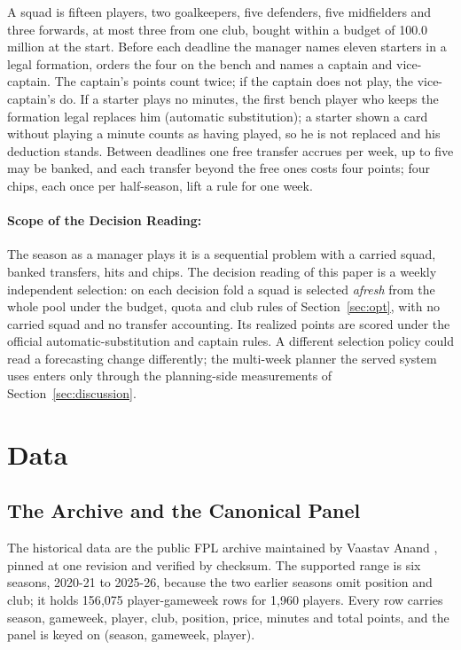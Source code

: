 \documentclass[11pt,a4paper]{article}
\begin{document}
A squad is fifteen players, two goalkeepers, five defenders, five midfielders and three forwards, at most three from one club, bought within a budget of 100.0 million at the start. Before each deadline the manager names eleven starters in a legal formation, orders the four on the bench and names a captain and vice-captain. The captain's points count twice; if the captain does not play, the vice-captain's do. If a starter plays no minutes, the first bench player who keeps the formation legal replaces him (automatic substitution); a starter shown a card without playing a minute counts as having played, so he is not replaced and his deduction stands. Between deadlines one free transfer accrues per week, up to five may be banked, and each transfer beyond the free ones costs four points; four chips, each once per half-season, lift a rule for one week.

\paragraph{Scope of the Decision Reading:} The season as a manager plays it is a sequential problem with a carried squad, banked transfers, hits and chips. The decision reading of this paper is a weekly independent selection: on each decision fold a squad is selected \emph{afresh} from the whole pool under the budget, quota and club rules of Section~\ref{sec:opt}, with no carried squad and no transfer accounting. Its realized points are scored under the official automatic-substitution and captain rules. A different selection policy could read a forecasting change differently; the multi-week planner the served system uses enters only through the planning-side measurements of Section~\ref{sec:discussion}.

\section{Data}
\label{sec:data}

\subsection{The Archive and the Canonical Panel}

The historical data are the public FPL archive maintained by Vaastav Anand \cite{vaastav}, pinned at one revision and verified by checksum. The supported range is six seasons, 2020-21 to 2025-26, because the two earlier seasons omit position and club; it holds 156{,}075 player-gameweek rows for 1{,}960 players. Every row carries season, gameweek, player, club, position, price, minutes and total points, and the panel is keyed on (season, gameweek, player).
\end{document}

